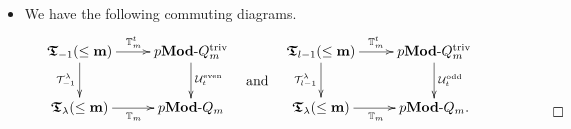\begin{thm}
\begin{itemize}
\[\begin{xy}
  \xymatrix{
      \T_{\lambda}(\leq\bbm) \ar[r]^/-0.1em/{\bV} \ar[d]_{\mathcal{T}_{\lambda}^{-1}}    &   \pModAm \ar[d]^{\mathcal U_{\mathrm{even}}^t}  \\
      \T_{-1}(\leq\bbm)\ar[r]_/-0.1em/{\bV^t}             &   \pModAt  
  }
\end{xy}
\quad\raisebox{-0.75cm}{\text{and}}\quad
\begin{xy}
  \xymatrix{
      \T_{\lambda}(\leq\bbm) \ar[r]^/-0.1em/{\bV} \ar[d]_{\mathcal{T}_{\lambda}^{l-1}}    &   \pModAm \ar[d]^{\mathcal U_{\mathrm{odd}}^t}  \\
      \T_{l-1}(\leq\bbm)\ar[r]_/-0.1em/{\bV^t}             &   \pModAt.  
  }
\end{xy}
\]
\item[(g)] We have the following commuting diagrams.
\[
\begin{xy}
  \xymatrix{
      \T_{-1}(\leq\bbm) \ar[r]^/-0.1em/{\bV^t} \ar[d]_{\mathcal{T}^{\lambda}_{-1}}    &   \pModAt \ar[d]^{\mathcal U^{\mathrm{even}}_t}  \\
      \T_{\lambda}(\leq\bbm) \ar[r]_/-0.1em/{\bV}             &   \pModAm  
  }
\end{xy}
\quad\raisebox{-0.75cm}{\text{and}}\quad
\begin{xy}
  \xymatrix{
      \T_{l-1}(\leq\bbm) \ar[r]^/-0.1em/{\bV^t} \ar[d]_{\mathcal{T}^{\lambda}_{l-1}}    &   \pModAt \ar[d]^{\mathcal U^{\mathrm{odd}}_t}  \\
      \T_{\lambda}(\leq\bbm) \ar[r]_/-0.1em/{\bV}             &   \pModAm.  
  }
\end{xy}
\hspace{1.95cm}
\raisebox{-1.55cm}{\makeqed}
\hspace{-1.95cm} 
\]
\end{itemize}
\end{thm}




